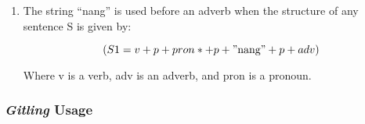 \begin{enumerate}
      \item The string “nang” is used before an adverb when the structure of any sentence S is given by:

            \[
                  (S1 = v + p + pron* + p + "\text{nang}" + p + adv)
            \]

            Where v is a verb, adv is an adverb, and pron is a pronoun.

\end{enumerate}



\subsubsection{\textit{Gitling} Usage}\texttt{}